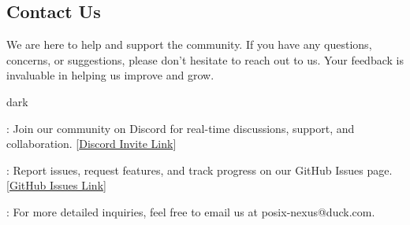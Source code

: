 \subsection{Contact Us}
\label{sec:introduction:sub:contact}
We are here to help and support the community.
If you have any questions, concerns, or suggestions, please don't hesitate to reach out to us.
Your feedback is invaluable in helping us improve and grow.
\bigskip
\begin{baseBoxOne}{}{dark}
    \begin{posnexItemize}
        \item[\sA] : Join our  community on Discord for real-time discussions, support, and collaboration. [\href{https://discord.gg/GB9twwpCNM}{Discord Invite Link}]
        \item[\sA] : Report issues, request features, and track progress on our GitHub Issues page. [\href{https://github.com/Canine-Table/posix-nexus/issues}{GitHub Issues Link}]
        \item[\sA] : For more detailed inquiries, feel free to email us at posix-nexus@duck.com.
    \end{posnexItemize}
\end{baseBoxOne}
